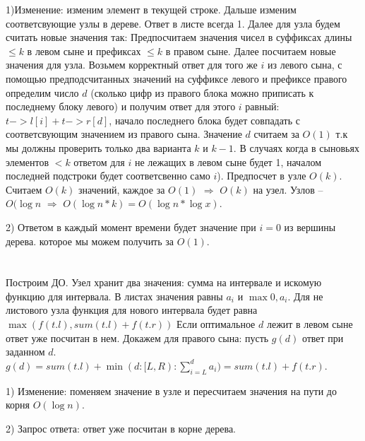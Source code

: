 \documentclass{article}
\begin{document}
\begin{flushleft}
1)Изменение: изменим элемент в текущей строке. Дальше изменим соответсвующие узлы в дереве. Ответ в листе всегда 1. Далее для узла будем считать новые значения так: Предпосчитаем значения чисел в суффиксах длины $\le k$ в левом сыне и префиксах $\le k$ в правом сыне. Далее посчитаем новые значения для узла. Возьмем корректный ответ для того же $i$ из левого сына, с помощью предподсчитанных значений на суффиксе левого и префиксе правого определим число $d$ (сколько цифр из правого блока можно приписать к последнему блоку левого) и получим ответ для этого $i$ равный: $t->l[i] + t->r[d]$, начало последнего блока будет совпадать с соответсвующим значением из правого сына. Значение $d$ считаем за $O(1)$ т.к мы должны проверить только два варианта $k$ и $k - 1$. В случаях когда в сыновьях элементов $<k$ ответом для $i$ не лежащих в левом сыне будет 1, началом последней подстроки будет соответсвенно само $i$). Предпосчет в узле $O(k)$. Считаем $O(k)$ значений, каждое за $O(1)$ $\Rightarrow$ $O(k)$ на узел. Узлов -- $O(\log{n}$ $\Rightarrow$ $O(\log{n} * k) = O(\log{n} * \log{x})$.

2) Ответом в каждый момент времени будет значение при $i = 0$ из вершины дерева. которое мы можем получить за $O(1)$.

\section{}

Построим ДО. Узел хранит два значения: сумма на интервале и искомую функцию для интервала.
В листах значения равны $a_i$ и $\max{0, a_i}$. Для не листового узла функция для нового интервала будет равна $\max(f(t.l), sum(t.l) + f(t.r))$ Если оптимальное $d$ лежит в левом сыне ответ уже посчитан в нем. Докажем для правого сына: пусть $g(d)$ ответ при заданном $d$. $g(d) = sum(t.l) + \min(d : [L, R): \sum\limits_{i = L}^{d}{a_i}) = sum(t.l) + f(t.r)$.

1) Изменение: поменяем значение в узле и пересчитаем значения на пути до корня $O(\log{n})$.

2) Запрос ответа: ответ уже посчитан в корне дерева.

\end{flushleft}
\end{document}
